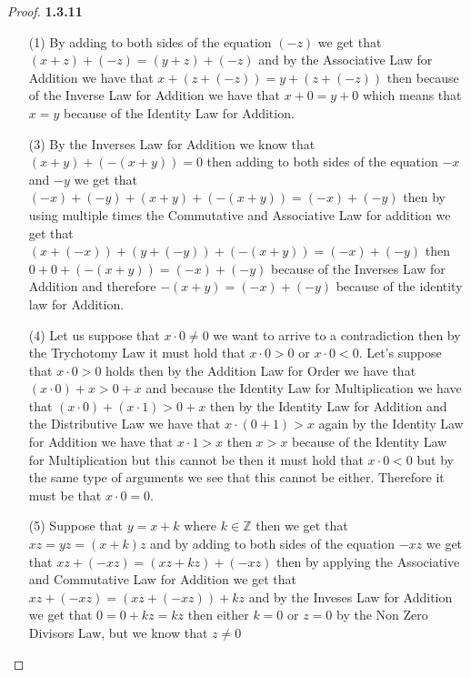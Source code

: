\documentclass[11pt]{article}
\newcommand{\Z}{\mathbb{Z}}
\theoremstyle{definition}
\begin{document}
    \begin{proof}{\textbf{1.3.11}}
        \begin{itemize}
        \item [(1)]
        By adding to both sides of the equation $(-z)$ we get that $(x + z) + (-z) = (y + z) + (-z)$
        and by the Associative Law for Addition we have that $x + (z + (-z)) = y + (z + (-z))$
        then because of the Inverse Law for Addition we have that $x + 0 = y + 0$
        which means that $x = y$ because of the Identity Law for Addition.
        \item [(3)]
        By the Inverses Law for Addition we know that $(x+y) + (-(x+y)) = 0$ then adding
        to both sides of the equation $-x$ and $-y$ we get that
        $(-x) + (-y) + (x+y) + (-(x+y)) = (-x) + (-y)$ then by using multiple times the
        Commutative and Associative Law for addition we get that
        $(x + (-x)) + (y + (-y)) + (-(x+y)) = (-x) + (-y)$ then
        $0 + 0 + (-(x+y)) = (-x) + (-y)$ because of the Inverses Law for Addition and
        therefore $-(x+y) = (-x) + (-y)$ because of the identity law for Addition.
        \item [(4)]
        Let us suppose that $x\cdot 0 \neq 0$ we want to arrive to a contradiction 
        then by the Trychotomy Law it must hold
        that $x \cdot 0 > 0$ or $x \cdot 0 < 0$. Let's suppose that $x \cdot 0 > 0$
        holds then by the Addition Law for Order we have that $(x \cdot 0) + x > 0 + x$
        and because the Identity Law for Multiplication we have that  
        $(x \cdot 0) + (x \cdot 1) > 0 + x$ then by the Identity Law for Addition and
        the Distributive Law we have that $x \cdot (0 + 1) > x$ again by the Identity
        Law for Addition we have that $x \cdot 1 > x$ then $x > x$ because of the
        Identity Law for Multiplication but this cannot be then it must hold that
        $x \cdot 0 < 0$ but by the same type of arguments we see that this cannot be
        either. Therefore it must be that $x \cdot 0 = 0$.
        \item [(5)]
        Suppose that $y = x + k$ where $k \in \Z$ then we get that $xz = yz = (x + k)z$
        and by adding to both sides of the equation $-xz$ we get that
        $xz + (-xz) = (xz + kz) + (-xz)$ then by applying the Associative and 
        Commutative Law for Addition we get that $xz + (-xz) = (xz + (-xz)) + kz$
        and by the Inveses Law for Addition we get that $0 = 0 + kz = kz$ then either
        $k = 0$ or $z = 0$ by the Non Zero Divisors Law, but we know that $z \neq 0$

\end{itemize}
\end{proof}
\end{document}
